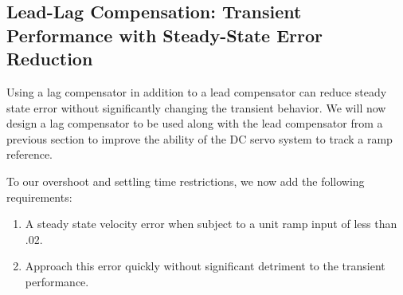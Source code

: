 \documentclass[11pt,a4paper]{article}
\begin{document}




\subsection{Lead-Lag Compensation: Transient Performance with Steady-State Error Reduction}
Using a lag compensator in addition to a lead compensator can reduce steady state error without significantly changing the transient behavior. We will now design a lag compensator to be used along with the lead compensator from a previous section to improve the ability of the DC servo system to track a ramp reference.

To our overshoot and settling time restrictions, we now add the following requirements:

\begin{enumerate}
	\item A steady state velocity error when subject to a unit ramp input of less than .02.
	\item Approach this error quickly without significant detriment to the transient performance.
	
\end{enumerate}
\end{document}
